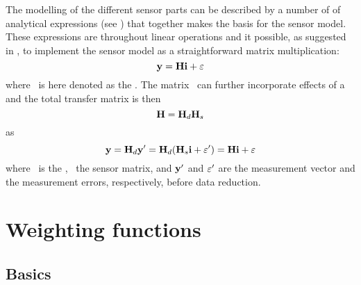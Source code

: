  The modelling of the different sensor parts can be described by a
 number of of analytical expressions (see \citet{eriksson:97a}) that
 together makes the basis for the sensor model. These expressions are
 throughout linear operations and it possible, as suggested in
 \citet{eriksson:00a}, to implement the sensor model as a
 straightforward matrix multiplication:
 \begin{equation}
   \mathbf{y} = \mathbf{H} \mathbf{i} + \varepsilon
  \label{eq:formalism:H}
 \end{equation}
 where \SnsMtr\ is here denoted as the .  The matrix \SnsMtr\ can further incorporate effects of a
  and the total transfer matrix is then
 \begin{equation}
   \mathbf{H} = \mathbf{H}_{d} \mathbf{H}_{s}
  \label{eq:formalism:Hs}
 \end{equation}
 as
 \begin{equation}
   \mathbf{y} = \mathbf{H}_{d} \mathbf{y}' = \mathbf{H}_{d} (\mathbf{H}_{s} \mathbf{i} + 
                                    \varepsilon') = \mathbf{H} \mathbf{i} + \varepsilon
  \label{eq:formalism:datared}
 \end{equation}
 where \ is the ,
 \ the sensor matrix, and $\mathbf{y}'$ and $\varepsilon'$ are
 the measurement vector and the measurement errors, respectively,
 before data reduction.



\section{Weighting functions} 
 \label{sec:formalism:wfuns}
 
 \subsection{Basics} 
 
